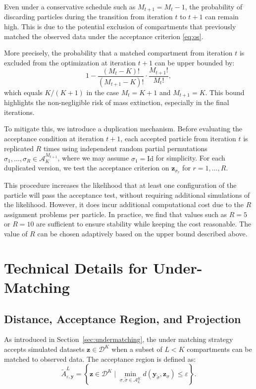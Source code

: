 \documentclass[lineno]{biometrika}
\def\dataspace{\mathcal{D}}
\def\obsdata{\mathbf{y}}
\def\simdata{\mathbf{z}}
\begin{document}
Even under a conservative schedule such as \( M_{t+1} = M_t - 1 \), the probability of discarding particles during the transition from iteration \( t \) to \( t+1 \) can remain high. This is due to the potential exclusion of compartments that previously matched the observed data under the acceptance criterion \eqref{eq:os}.

More precisely, the probability that a matched compartment from iteration \( t \) is excluded from the optimization at iteration \( t+1 \) can be upper bounded by:
\[
1 - \frac{(M_t - K)!}{(M_{t+1} - K)!} \cdot \frac{M_{t+1}!}{M_t!},
\]
which equals \( K/(K+1) \) in the case \( M_t = K + 1 \) and \( M_{t+1} = K \). This bound highlights the non-negligible risk of mass extinction, especially in the final iterations.

To mitigate this, we introduce a duplication mechanism. Before evaluating the acceptance condition at iteration \( t+1 \), each accepted particle from iteration \( t \) is replicated \( R \) times using independent random partial permutations \( \sigma_1, \dots, \sigma_R \in \mathcal{A}_K^{M_{t+1}} \), where we may assume \( \sigma_1 = \mathrm{Id} \) for simplicity. For each duplicated version, we test the acceptance criterion on \( \simdata_{\sigma_r} \) for \( r = 1, \dots, R \).

This procedure increases the likelihood that at least one configuration of the particle will pass the acceptance test, without requiring additional simulations of the likelihood. However, it does incur additional computational cost due to the \( R \) assignment problems per particle. In practice, we find that values such as \( R = 5 \) or \( R = 10 \) are sufficient to ensure stability while keeping the cost reasonable. The value of \( R \) can be chosen adaptively based on the upper bound described above.

\section{Technical Details for Under-Matching}
\label{appendix_um}

\subsection{Distance, Acceptance Region, and Projection}

As introduced in Section~\ref{sec:undermatching}, the under matching strategy accepts simulated datasets \( \simdata \in \dataspace^K \) when a subset of \( L < K \) compartments can be matched to observed data. The acceptance region is defined as:
\[
\tilde A_{\varepsilon, \obsdata}^{L} = \left\{ \simdata \in \dataspace^K \mid \min_{\sigma, \tilde{\sigma} \in \mathcal A_L^K} d(\obsdata_{\tilde \sigma}, \simdata_\sigma) \leq \varepsilon \right\}.
\]
\end{document}
